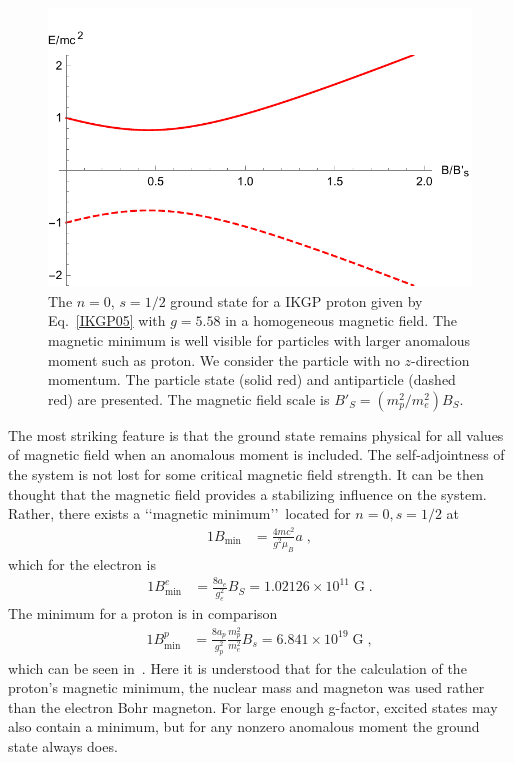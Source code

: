 \begin{figure}[h]
 \centering
 \includegraphics[clip, trim=0.0cm 0.0cm 0.0cm 0.5cm,width=\linewidth]{plots/chap02moment/lanplot09.pdf}
 \caption{The $n=0$, $s=1/2$ ground state for a IKGP proton given by Eq.~\eqref{IKGP05} with $g=5.58$ in a homogeneous magnetic field. The magnetic minimum is well visible for particles with larger anomalous moment such as proton. We consider the particle with no $z$-direction momentum. The particle state (solid red) and antiparticle (dashed red) are presented. The magnetic field scale is ${B}'_{S}=(m^2_p/m^2_e){B}_S$.}
\label{f05}
\end{figure}

The most striking feature is that the ground state remains physical for all values of magnetic field when an anomalous moment is included. The self-adjointness of the system is not lost for some critical magnetic field strength. It can be then thought that the magnetic field provides a stabilizing influence on the system. Rather, there exists a \lq\lq magnetic minimum\rq\rq\ located for $n=0, s=1/2$ at
\begin{alignat}{1}
\label{IKGP06} B_{\mathrm{min}}&=\frac{4mc^{2}}{g^{2}\mu_{B}}a\;,
\end{alignat}
which for the electron is
\begin{alignat}{1}
B_{\mathrm{min}}^{e}&=\frac{8a_e}{g_e^2}{B}_S
=1.02126\times10^{11}\;\mathrm{G}\;.
\end{alignat}
The minimum for a proton is in comparison
\begin{alignat}{1}
B_{\mathrm{min}}^{p}&=\frac{8a_p}{g_p^2} \frac{m_p^2}{m_e^2}{B}_s
=6.841\times10^{19}\;\mathrm{G}\;,
\end{alignat}
which can be seen in~. Here it is understood that for the calculation of the proton's magnetic minimum, the nuclear mass and magneton was used rather than the electron Bohr magneton. For large enough g-factor, excited states may also contain a minimum, but for any nonzero anomalous moment the ground state always does.

